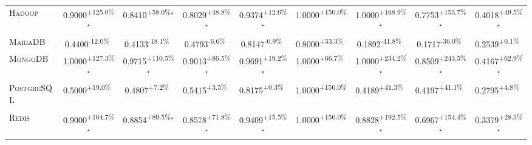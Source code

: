 \begin{table}[htbp]
\begin{tabular}{l|cccc|cccc}
\textsc{Hadoop} & \cellcolor{green!30}0.9000\textsuperscript{+125.0\%}$^\star$ & \cellcolor{green!30}0.8410\textsuperscript{+58.0\%}$^\star$ & \cellcolor{green!30}0.8029\textsuperscript{+48.8\%}$^\star$ & \cellcolor{green!30}0.9374\textsuperscript{+12.6\%}$^\star$ & \cellcolor{green!30}1.0000\textsuperscript{+150.0\%}$^{\,\,\,}$ & \cellcolor{green!30}1.0000\textsuperscript{+168.9\%}$^\star$ & \cellcolor{green!30}0.7753\textsuperscript{+153.7\%}$^\star$ & \cellcolor{green!30}0.4018\textsuperscript{+49.5\%}$^\star$ \\
\textsc{MariaDB} & \cellcolor{red!30}0.4400\textsuperscript{-12.0\%}$^{\,\,\,}$ & \cellcolor{red!30}0.4133\textsuperscript{-18.1\%}$^{\,\,\,}$ & \cellcolor{red!30}0.4793\textsuperscript{-6.6\%}$^{\,\,\,}$ & \cellcolor{red!30}0.8147\textsuperscript{-0.9\%}$^{\,\,\,}$ & \cellcolor{green!30}0.8000\textsuperscript{+33.3\%}$^{\,\,\,}$ & \cellcolor{red!30}0.1892\textsuperscript{-41.8\%}$^{\,\,\,}$ & \cellcolor{red!30}0.1717\textsuperscript{-36.0\%}$^{\,\,\,}$ & \cellcolor{green!30}0.2539\textsuperscript{+0.1\%}$^{\,\,\,}$ \\
\textsc{MongoDB} & \cellcolor{green!30}1.0000\textsuperscript{+127.3\%}$^\star$ & \cellcolor{green!30}0.9715\textsuperscript{+110.5\%}$^\star$ & \cellcolor{green!30}0.9013\textsuperscript{+86.5\%}$^\star$ & \cellcolor{green!30}0.9691\textsuperscript{+19.2\%}$^\star$ & \cellcolor{green!30}1.0000\textsuperscript{+66.7\%}$^{\,\,\,}$ & \cellcolor{green!30}1.0000\textsuperscript{+234.2\%}$^\star$ & \cellcolor{green!30}0.8509\textsuperscript{+243.5\%}$^\star$ & \cellcolor{green!30}0.4167\textsuperscript{+62.9\%}$^\star$ \\
\textsc{PostgreSQL} & \cellcolor{green!30}0.5000\textsuperscript{+19.0\%}$^{\,\,\,}$ & \cellcolor{green!30}0.4807\textsuperscript{+7.2\%}$^{\,\,\,}$ & \cellcolor{green!30}0.5415\textsuperscript{+3.5\%}$^{\,\,\,}$ & \cellcolor{green!30}0.8175\textsuperscript{+0.3\%}$^{\,\,\,}$ & \cellcolor{green!30}1.0000\textsuperscript{+150.0\%}$^{\,\,\,}$ & \cellcolor{green!30}0.4189\textsuperscript{+41.3\%}$^{\,\,\,}$ & \cellcolor{green!30}0.4197\textsuperscript{+41.1\%}$^{\,\,\,}$ & \cellcolor{green!30}0.2795\textsuperscript{+4.8\%}$^{\,\,\,}$ \\
\textsc{Redis} & \cellcolor{green!30}0.9000\textsuperscript{+164.7\%}$^\star$ & \cellcolor{green!30}0.8854\textsuperscript{+89.5\%}$^\star$ & \cellcolor{green!30}0.8578\textsuperscript{+71.8\%}$^\star$ & \cellcolor{green!30}0.9409\textsuperscript{+15.5\%}$^\star$ & \cellcolor{green!30}1.0000\textsuperscript{+150.0\%}$^{\,\,\,}$ & \cellcolor{green!30}0.8828\textsuperscript{+192.5\%}$^\star$ & \cellcolor{green!30}0.6967\textsuperscript{+154.4\%}$^\star$ & \cellcolor{green!30}0.3379\textsuperscript{+28.3\%}$^\star$ \\

\end{tabular}
\end{table}
